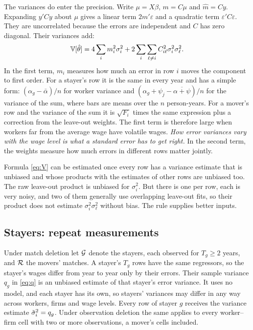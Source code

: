The variances do enter the precision. Write $\mu=X\beta$, $m=C\mu$ and
$\hat m=Cy$. Expanding $y'Cy$ about $\mu$ gives a linear term $2m'\varepsilon$
and a quadratic term $\varepsilon'C\varepsilon$. They are uncorrelated because
the errors are independent and $C$ has zero diagonal. Their variances add:
\begin{equation}\label{eq:V}
 \mathbb{V}[\hat\theta]=4\sum_i m_i^2\sigma_i^2
       +2\sum_i\sum_{\ell\ne i} C_{i\ell}^2\sigma_i^2\sigma_\ell^2 .
\end{equation}
In the first term, $m_i$ measures how much an error in row $i$ moves the
component to first order. For a stayer's row it is the same in every year and has a
simple form: $(\alpha_g-\bar\alpha)/n$ for worker variance and
$(\alpha_g+\psi_j-\overline{\alpha+\psi})/n$ for the variance of the sum, where bars
are means over the $n$ person-years. For a mover's row and the variance of the sum it
is $\sqrt{F_i}$ times the same expression plus a correction from the leave-out weights.
The first term is therefore large when workers far from the average wage have volatile
wages. \emph{How error variances vary with the wage level is what a standard error has
to get right.} In the second term, the weights measure how much errors in different
rows matter jointly.

Formula \eqref{eq:V} can be estimated once every row has a variance estimate that is
unbiased and whose products with the estimates of other rows are unbiased too. The raw
leave-out product is unbiased for $\sigma_i^2$. But there is one per row, each is very
noisy, and two of them generally use overlapping leave-out fits, so their product does
not estimate $\sigma_i^2\sigma_\ell^2$ without bias. The rule supplies better inputs.

\subsection{Stayers: repeat measurements}
Under match deletion let $\mathcal{G}$ denote the stayers, each observed for $T_g\ge2$ years,
and $\mathcal{R}$ the movers' matches. A stayer's $T_g$ rows have the same regressors, so the
stayer's wages differ from year to year only by their errors. Their sample variance
$q_g$ in \eqref{eq:q} is an unbiased estimate of that stayer's error variance. It uses
no model, and each stayer has its own, so stayers' variances may differ in any way
across workers, firms and wage levels. Every row of stayer $g$ receives the variance estimate
$\tilde\sigma_i^2=q_g$. Under observation deletion the same applies to every worker--firm cell
with two or more observations, a mover's cells included.

